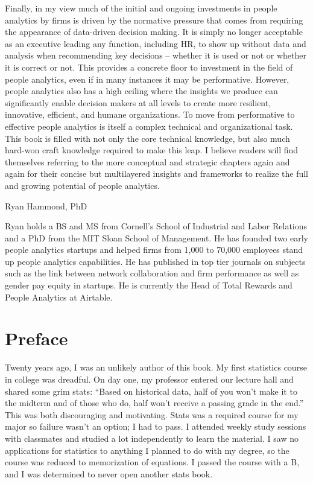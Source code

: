 \documentclass[
]{book}
\begin{document}
Finally, in my view much of the initial and ongoing investments in people analytics by firms is driven by the normative pressure that comes from requiring the appearance of data-driven decision making. It is simply no longer acceptable as an executive leading any function, including HR, to show up without data and analysis when recommending key decisions -- whether it is used or not or whether it is correct or not. This provides a concrete floor to investment in the field of people analytics, even if in many instances it may be performative. However, people analytics also has a high ceiling where the insights we produce can significantly enable decision makers at all levels to create more resilient, innovative, efficient, and humane organizations. To move from performative to effective people analytics is itself a complex technical and organizational task. This book is filled with not only the core technical knowledge, but also much hard-won craft knowledge required to make this leap. I believe readers will find themselves referring to the more conceptual and strategic chapters again and again for their concise but multilayered insights and frameworks to realize the full and growing potential of people analytics.

Ryan Hammond, PhD

Ryan holds a BS and MS from Cornell's School of Industrial and Labor Relations and a PhD from the MIT Sloan School of Management. He has founded two early people analytics startups and helped firms from 1,000 to 70,000 employees stand up people analytics capabilities. He has published in top tier journals on subjects such as the link between network collaboration and firm performance as well as gender pay equity in startups. He is currently the Head of Total Rewards and People Analytics at Airtable.

\hypertarget{preface}{%
\chapter*{Preface}\label{preface}}

Twenty years ago, I was an unlikely author of this book. My first statistics course in college was dreadful. On day one, my professor entered our lecture hall and shared some grim stats: ``Based on historical data, half of you won't make it to the midterm and of those who do, half won't receive a passing grade in the end.'' This was both discouraging and motivating. Stats was a required course for my major so failure wasn't an option; I had to pass. I attended weekly study sessions with classmates and studied a lot independently to learn the material. I saw no applications for statistics to anything I planned to do with my degree, so the course was reduced to memorization of equations. I passed the course with a B, and I was determined to never open another stats book.
\end{document}

